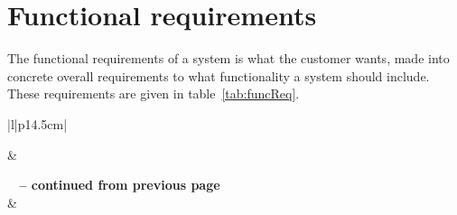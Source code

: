 \newpage
\section{Functional requirements}
The functional requirements of a system is what the customer wants, made into concrete overall requirements to what functionality a system should include. These requirements are given in table~\ref{tab:funcReq}.

\begin{longtable}{|l|p{14.5cm}|}

\hline
{} &  \\
\endfirsthead


%
{{\bfseries \tablename\ \thetable{} -- continued from previous page}} \\\hline
{} &  \\
\endhead

 \\ \hline
\endfoot
 
\endlastfoot


\end{longtable}

